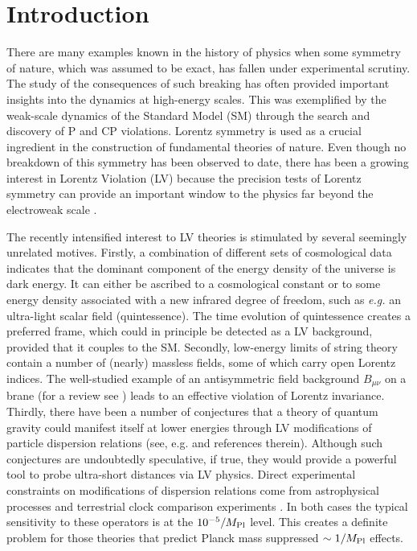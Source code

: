 \documentclass[12pt]{revtex4}
\begin{document}
\begin{titlepage}
\end{titlepage}


\newpage

\setcounter{footnote}{0}
\setcounter{equation}{0}


\section{Introduction}
\label{Intro}


There are many examples known in the history of physics when some
symmetry of nature, which was assumed to be exact, has fallen under
experimental scrutiny. The study of the consequences of such breaking
has often provided important insights into the dynamics at
high-energy scales. This was exemplified by the weak-scale dynamics of
the Standard Model (SM) through the search and discovery of P and CP 
violations. Lorentz symmetry is used as a crucial ingredient in the
construction of fundamental theories of nature. Even though no
breakdown of this symmetry has been observed to date, there has been a
growing interest in Lorentz Violation (LV) because the precision 
tests of Lorentz symmetry can provide an important window to the
physics far beyond the electroweak scale
\cite{Kost1,CG,Jacobsonreview,PhysToday,Sigl:2004cq,Mattingly:2005re}. 


The recently intensified interest to LV theories is stimulated by
several seemingly unrelated motives. Firstly, a combination of different sets of 
cosmological data indicates that the dominant component of the energy
density of the universe is dark energy. It can either be ascribed
to a cosmological constant or to some energy density associated with a
new infrared degree of freedom, such as {\em e.g.} an ultra-light
scalar field (quintessence). The time evolution of quintessence
creates a preferred frame, which could in principle be detected as a
LV background, provided that it couples to the SM. Secondly, low-energy
limits of string theory contain a number of (nearly) massless fields,
some of which carry open Lorentz indices. The well-studied 
example of an antisymmetric field background $B_{\mu\nu}$ on a brane
(for a review see \cite{DN}) leads to an effective violation of Lorentz
invariance. Thirdly, there have been a number of conjectures that a
theory of quantum gravity could manifest itself at lower energies
through LV modifications of particle dispersion relations 
(see, e.g. \cite{lcq,Vucetich:2005ra} and references therein). Although such
conjectures are undoubtedly speculative, if true, they would provide a
powerful tool to probe ultra-short distances via LV physics.  Direct
experimental constraints on modifications of dispersion relations come
from astrophysical processes \cite{CFJ,AmC,Ted1,GK,Kost2,Sarkar} and
terrestrial clock comparison experiments \cite{clock1,clock2,Vuc,MP:}. 
In both cases the typical sensitivity to these operators is at the
$10^{-5}/M_{\rm Pl}$ level. This creates a definite problem for those
theories that predict Planck mass suppressed $\sim 1/M_{\rm Pl}$
effects. 
\end{document}
